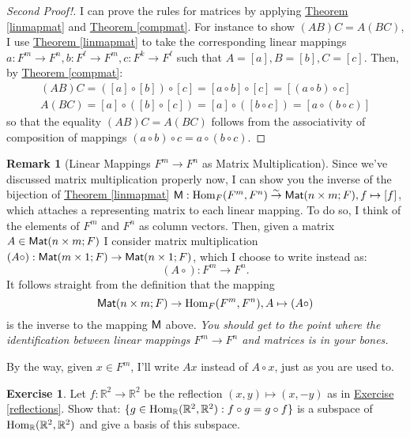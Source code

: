 \documentclass[11pt]{amsbook}
\theoremstyle{definition}
\newtheorem{rem}[theorem]{Remark}
\newtheorem{exercise}{Exercise}
\begin{document}
\begin{proof}[Second Proof!] I can prove the rules for matrices by applying \hyperref[linmapmat]{Theorem \ref{linmapmat}} and \hyperref[compmat]{Theorem \ref{compmat}}. For instance to show $(AB)C = A (BC)$, I use \hyperref[linmapmat]{Theorem \ref{linmapmat}} to take the corresponding linear mappings $a: F^m \to F^n, b: F^{\ell}
 \to F^m , c: F^k \to F^{\ell}$ such that $A = [a], B = [b], C= [c]$. Then, by \hyperref[compmat]{Theorem \ref{compmat}}:
 \begin{eqnarray*}
 (AB)C = ([a]\circ [b]) \circ [c] = [a\circ b]\circ [c] = [(a\circ b) \circ c] \\
 A(BC) = [a]\circ ([b]\circ [c]) = [a] \circ ([b\circ c]) = [a\circ (b\circ c)]
 \end{eqnarray*}
so that the equality $(AB)C = A(BC)$ follows from the associativity of composition of mappings $(a\circ b) \circ c = a\circ (b\circ c)$.
\end{proof}

\begin{rem}[Linear Mappings $F^m \to F^n$ as Matrix Multiplication] Since we've discussed matrix multiplication properly now, I can show you the inverse of the bijection of \hyperref[linmapmat]{Theorem \ref{linmapmat}}  ${\sf M}: {\rm Hom}_F(F^m, F^n) \stackrel{\sim}{\to} {\sf Mat}(n\times m ; F), f\mapsto [f]$, which attaches a representing matrix to each linear mapping. To do so, I think of the elements of $F^m$ and $F^n$ as column vectors. Then, given a matrix $A\in {\sf Mat}(n\times m; F)$ I consider matrix multiplication $(A\circ) : {\sf Mat}(m\times 1; F) \to {\sf Mat}(n\times 1; F)$, which I choose to write instead as: $$(A\circ) : F^m \to F^n.$$ It follows straight from the definition that the mapping \begin{equation} \label{inversemap} {\sf Mat}(n\times m ; F) \to {\rm Hom}_F(F^m, F^n), A \mapsto (A\circ)\end{equation} is the inverse to the mapping ${\sf M}$ above. {\it You should get to the point where the identification between linear mappings $F^m\to F^n$ and matrices is in your bones.}

By the way, given $x\in F^m$, I'll write  $Ax$ instead of $A\circ x$, just as you are used to.
\end{rem}

\begin{exercise}
Let $f: \mathbb{R}^2 \to \mathbb{R}^2$ be the reflection $(x,y) \mapsto (x,-y)$ as in \hyperref[reflections]{Exercise \ref{reflections}}. Show that: $\{ g\in {\rm Hom}_{\mathbb{R}}(\mathbb{R}^2, \mathbb{R}^2) : f\circ g = g\circ f \}$ is a subspace of $ {\rm Hom}_{\mathbb{R}}(\mathbb{R}^2, \mathbb{R}^2)$ and give a basis of this subspace.
\end{exercise}
\end{document}
